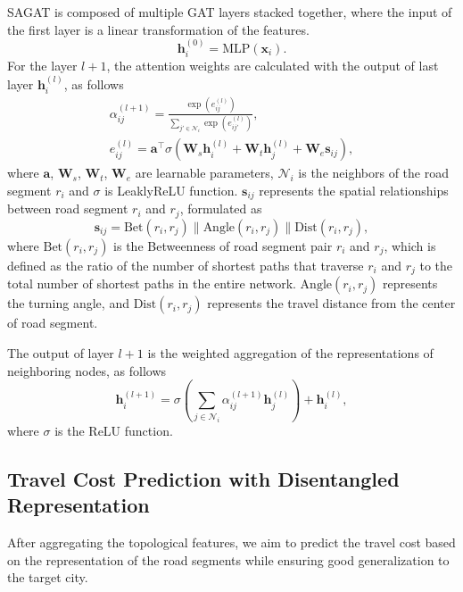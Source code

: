 SAGAT is composed of multiple GAT layers stacked together, where the input of the first layer is a linear transformation of the features.
\begin{equation}
    \bm{h}_{i}^{(0)} = \text{MLP}(\bm{x}_{i}).
\end{equation} 
For the layer $l + 1$, the attention weights are calculated with the output of last layer $\bm{h}_{i}^{(l)}$, as follows
\begin{equation}
\begin{gathered}
    \alpha_{ij}^{(l+1)} = \frac{\exp{ \left( e_{ij}^{(l)} \right)}}{\sum_{j'\in \mathcal{N}_i}\exp \left( e_{ij'}^{(l)} \right)}, \\
    e_{ij}^{(l)} 
    = \bm{a}^\top \sigma \left( \bm{W}_s \bm{h}_i^{(l)} + \bm{W}_t \bm{h}_j^{(l)} + \bm{W}_e  \bm{s}_{ij} \right),
\end{gathered}
\end{equation}
where $\bm{a}$, $\bm{W}_s$, $\bm{W}_t$, $\bm{W}_e$ are learnable parameters, $\mathcal{N}_i$ is the neighbors of the road segment $r_i$ and $\sigma$ is LeaklyReLU function.
$\bm{s}_{ij}$ represents the spatial relationships between road segment $r_i$ and $r_j$, formulated as
\begin{equation}
    \bm{s}_{ij} =  \text{Bet}(r_i, r_j)\| \text{Angle}(r_i, r_j)\| \text{Dist}(r_i, r_j),
\end{equation}
where $\text{Bet}(r_i, r_j)$ is the Betweenness of road segment pair $r_i$ and $r_j$, which is defined as the ratio of the number of shortest paths that traverse $r_i$ and $r_j$ to the total number of shortest paths in the entire network. $\text{Angle}(r_i, r_j)$ represents the turning angle, and $\text{Dist}(r_i, r_j)$ represents the travel distance from the center of road segment.

The output of layer $l + 1$ is the weighted aggregation of the representations of neighboring nodes, as follows
\begin{equation}
    \bm{h}^{(l+1)}_{i} = \sigma \left(\sum_{j \in \mathcal{N}_i} \alpha_{ij}^{(l+1)} \bm{h}^{(l)}_{j}\right) + \bm{h}_{i}^{(l)},
\end{equation}
where $\sigma$ is the ReLU function. 

\subsection{Travel Cost Prediction with Disentangled Representation}

After aggregating the topological features, we aim to predict the travel cost based on the representation of the road segments while ensuring good generalization to the target city. 


